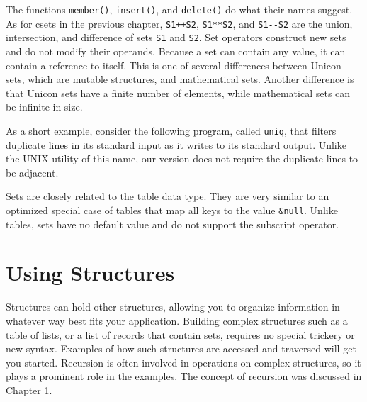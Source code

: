 The functions \texttt{member()},
\texttt{insert()}, and
\texttt{delete()} do what their names suggest. As
for csets in the previous chapter, \texttt{S1++S2}, \texttt{S1**S2},
and \texttt{S1-{}-S2} are the union,
intersection, and difference of sets \texttt{S1} and \texttt{S2}. Set
operators construct new sets and do not modify their operands. Because
a set can contain any value, it can contain a
reference to itself. This is one of several
differences between Unicon sets, which are mutable structures, and
mathematical sets. Another difference is that Unicon sets have a finite
number of elements, while mathematical sets can be infinite in size.

As a short example, consider the following program, called
\texttt{uniq}, that filters duplicate lines in its standard input as it
writes to its standard output. Unlike the UNIX utility of this name,
our version does not require the duplicate lines to be adjacent.


Sets are closely related to the table data type. They are very similar
to an optimized special case of tables that map all keys to the value
\texttt{\&null}. Unlike tables, sets have no default value and do not
support the subscript operator.

\section{Using Structures}

Structures can hold other structures, allowing you to
organize information in whatever way best fits your application.
Building complex structures such as a table of lists, or a list
of records that contain sets, requires no special trickery or new
syntax. Examples of how such structures are accessed and
traversed will get you started. Recursion is often
involved in operations on complex structures, so it plays a prominent
role in the examples. The concept of recursion was discussed in Chapter
1.


